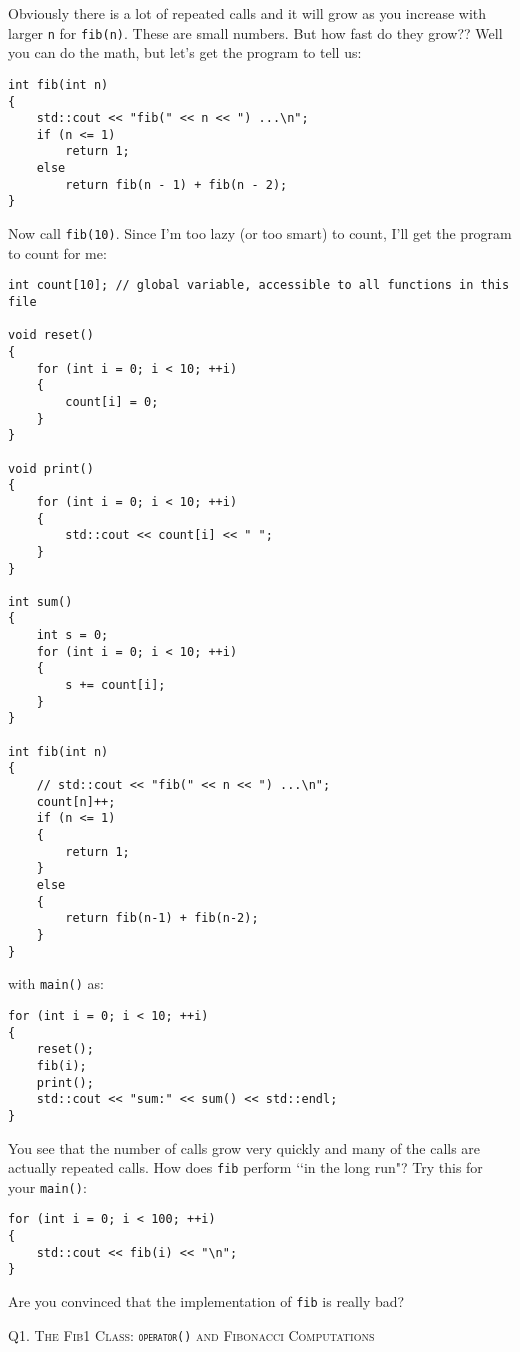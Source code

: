 Obviously there is a lot of repeated calls and it will grow as you increase
with larger \verb!n! for \verb!fib(n)!. These
are small numbers. But how fast do they grow?? Well you can do the math, but
let's get the program
to tell us:

\begin{Verbatim}[frame=single]
int fib(int n)
{
    std::cout << "fib(" << n << ") ...\n";
    if (n <= 1)
        return 1;
    else
        return fib(n - 1) + fib(n - 2);
}
\end{Verbatim}      

Now call \verb!fib(10)!. Since I'm too lazy (or too smart) to count, I'll get
the program to count for me:

\begin{Verbatim}[frame=single]
int count[10]; // global variable, accessible to all functions in this file

void reset()
{
    for (int i = 0; i < 10; ++i)
    {
        count[i] = 0;
    }  
}
  
void print()
{
    for (int i = 0; i < 10; ++i)
    {
        std::cout << count[i] << " ";
    }
}
  
int sum()
{
    int s = 0;
    for (int i = 0; i < 10; ++i)
    {
        s += count[i];
    }
}

int fib(int n)
{
    // std::cout << "fib(" << n << ") ...\n";
    count[n]++;
    if (n <= 1)
    {
        return 1;
    }
    else
    {
        return fib(n-1) + fib(n-2);
    }
}
\end{Verbatim}

with \verb!main()! as:

\begin{Verbatim}[frame=single]
for (int i = 0; i < 10; ++i)
{
    reset();
    fib(i);
    print();
    std::cout << "sum:" << sum() << std::endl;
}
\end{Verbatim}

You see that the number of calls grow very quickly and many of the calls are
actually repeated calls.
How does \verb!fib! perform
\lq\lq in the long run"? Try this for your \verb!main()!:

\begin{Verbatim}[frame=single]
for (int i = 0; i < 100; ++i)
{
    std::cout << fib(i) << "\n";
}
\end{Verbatim}

Are you convinced that the implementation of \verb!fib! is really bad?



\newpage
Q1.
\textsc{The Fib1 Class: \textnormal{\texttt{operator()}} and Fibonacci
Computations}

